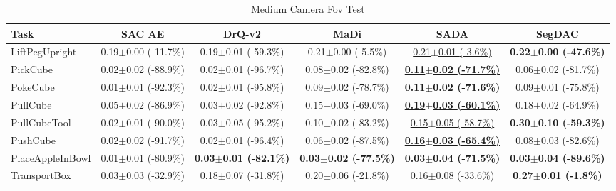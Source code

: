 \begin{table}[htbp]
\centering
\scriptsize
\caption{Medium Camera Fov Test}
\label{tab:appendix_camerafovtest_medium}
\begin{adjustbox}{max width=\textwidth}
\begin{tabular}{l*{5}{c}}
\toprule
\textbf{Task} & \textbf{SAC AE} & \textbf{DrQ-v2} & \textbf{MaDi} & \textbf{SADA} & \textbf{SegDAC} \\
\midrule
LiftPegUpright & 0.19$\pm$0.00 \scriptsize{(-11.7\%)} & 0.19$\pm$0.01 \scriptsize{(-59.3\%)} & 0.21$\pm$0.00 \scriptsize{(-5.5\%)} & \underline{0.21$\pm$0.01 \scriptsize{(-3.6\%)}} & \textbf{0.22$\pm$0.00 \scriptsize{(-47.6\%)}} \\
PickCube & 0.02$\pm$0.02 \scriptsize{(-88.9\%)} & 0.02$\pm$0.01 \scriptsize{(-96.7\%)} & 0.08$\pm$0.02 \scriptsize{(-82.8\%)} & \textbf{\underline{0.11$\pm$0.02 \scriptsize{(-71.7\%)}}} & 0.06$\pm$0.02 \scriptsize{(-81.7\%)} \\
PokeCube & 0.01$\pm$0.01 \scriptsize{(-92.3\%)} & 0.02$\pm$0.01 \scriptsize{(-95.8\%)} & 0.09$\pm$0.02 \scriptsize{(-78.7\%)} & \textbf{\underline{0.11$\pm$0.02 \scriptsize{(-71.6\%)}}} & 0.09$\pm$0.01 \scriptsize{(-75.8\%)} \\
PullCube & 0.05$\pm$0.02 \scriptsize{(-86.9\%)} & 0.03$\pm$0.02 \scriptsize{(-92.8\%)} & 0.15$\pm$0.03 \scriptsize{(-69.0\%)} & \textbf{\underline{0.19$\pm$0.03 \scriptsize{(-60.1\%)}}} & 0.18$\pm$0.02 \scriptsize{(-64.9\%)} \\
PullCubeTool & 0.02$\pm$0.01 \scriptsize{(-90.0\%)} & 0.03$\pm$0.05 \scriptsize{(-95.2\%)} & 0.10$\pm$0.02 \scriptsize{(-83.2\%)} & \underline{0.15$\pm$0.05 \scriptsize{(-58.7\%)}} & \textbf{0.30$\pm$0.10 \scriptsize{(-59.3\%)}} \\
PushCube & 0.02$\pm$0.02 \scriptsize{(-91.7\%)} & 0.02$\pm$0.01 \scriptsize{(-96.4\%)} & 0.06$\pm$0.02 \scriptsize{(-87.5\%)} & \textbf{\underline{0.16$\pm$0.03 \scriptsize{(-65.4\%)}}} & 0.08$\pm$0.03 \scriptsize{(-82.6\%)} \\
PlaceAppleInBowl & 0.01$\pm$0.01 \scriptsize{(-80.9\%)} & \textbf{0.03$\pm$0.01 \scriptsize{(-82.1\%)}} & \textbf{0.03$\pm$0.02 \scriptsize{(-77.5\%)}} & \textbf{\underline{0.03$\pm$0.04 \scriptsize{(-71.5\%)}}} & \textbf{0.03$\pm$0.04 \scriptsize{(-89.6\%)}} \\
TransportBox & 0.03$\pm$0.03 \scriptsize{(-32.9\%)} & 0.18$\pm$0.07 \scriptsize{(-31.8\%)} & 0.20$\pm$0.06 \scriptsize{(-21.8\%)} & 0.16$\pm$0.08 \scriptsize{(-33.6\%)} & \textbf{\underline{0.27$\pm$0.01 \scriptsize{(-1.8\%)}}} \\
\bottomrule
\end{tabular}
\end{adjustbox}
\end{table}

